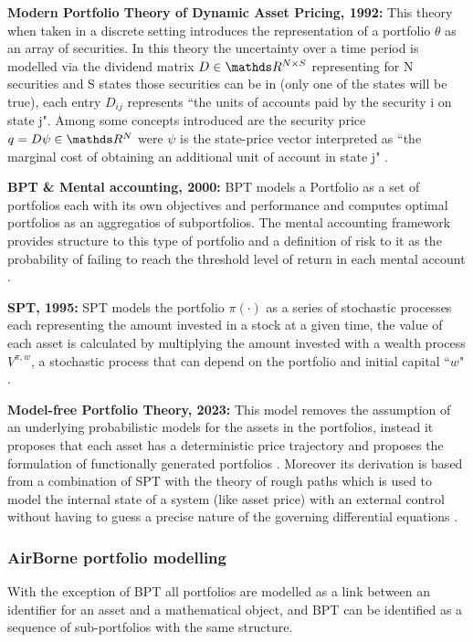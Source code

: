 \textbf{Modern Portfolio Theory of Dynamic Asset Pricing, 1992:} This theory when taken in a discrete setting introduces the representation of a portfolio $\theta$ as an array of securities. In this theory the uncertainty over a time period is modelled via the dividend matrix $D \in \R^{N\times S}$ representing for N securities and S states those securities can be in (only one of the states will be true), each entry $D_{ij}$ represents ``the units of accounts paid by the security i on state j".  Among some concepts introduced are the security price $q=D\psi  \in \R^N$ were $\psi$ is the state-price vector interpreted as ``the marginal cost of obtaining an additional unit of account in state j" \cite{DAP}. 

\textbf{\ac{BPT} \& Mental accounting, 2000:} \ac{BPT} models a Portfolio as a set of portfolios each with its own objectives and performance and computes optimal portfolios as an aggregatios of subportfolios. The mental accounting framework  provides structure to this type of portfolio and a definition of risk to it as the probability of failing to reach the threshold level of return in each mental account \cite{behaviouralPortfolioTheory2000, mental_accounting_10}. 

\textbf{\ac{SPT}, 1995:} \ac{SPT} models the portfolio $\pi(\cdot)$ as a series of stochastic processes each representing the amount invested in a stock at a given time, the value of each asset is calculated by multiplying the amount invested with a wealth process $V^{\pi,w}$, a stochastic process that can depend on the portfolio and initial capital ``$w$" \cite{stochastic_portfolio_theory_2009}. 

\textbf{Model-free Portfolio Theory, 2023:} This model removes the assumption of an underlying probabilistic models for the assets in the portfolios, instead it proposes that each asset has a deterministic price trajectory and proposes the formulation of functionally generated portfolios \cite{model_free_portfolio_theory}. Moreover its derivation is based from a combination of \ac{SPT} with the theory of rough paths which is used to model the internal state of a system (like asset price) with an external control without having to guess a precise nature of the governing differential equations \cite{rough_paths_02} . 

\subsubsection{AirBorne portfolio modelling}
With the exception of \ac{BPT} all portfolios are modelled as a link between an identifier for an asset and a mathematical object, and \ac{BPT} can be identified as a sequence of sub-portfolios with the same structure.

